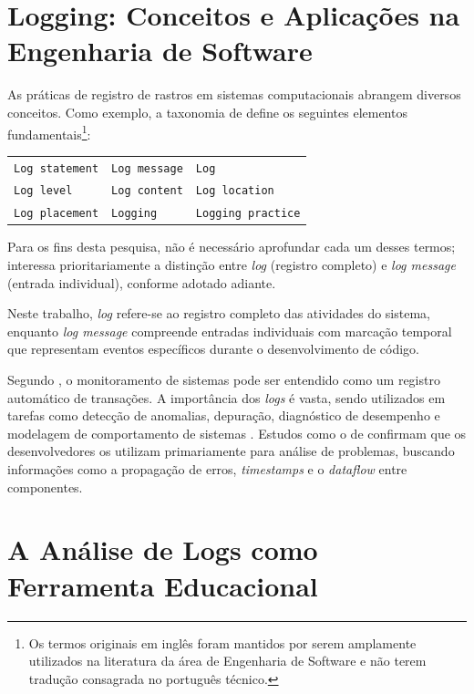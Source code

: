 \section{Logging: Conceitos e Aplicações na Engenharia de Software}
\label{sec:conceitos-logging}

As práticas de registro de rastros em sistemas computacionais abrangem diversos conceitos. Como exemplo, a taxonomia de \cite{gu2022logging} define os seguintes elementos fundamentais\footnote{Os termos originais em inglês foram mantidos por serem amplamente utilizados na literatura da área de Engenharia de Software e não terem tradução consagrada no português técnico.}:

\begingroup
\renewcommand{\arraystretch}{1.2}
\begin{tabular}{p{}p{}p{}}
    \texttt{Log statement} & \texttt{Log message} & \texttt{Log} \\
    \texttt{Log level} & \texttt{Log content} & \texttt{Log location} \\
    \texttt{Log placement} & \texttt{Logging} & \texttt{Logging practice} \\
\end{tabular}
\endgroup
\vspace{2em}

Para os fins desta pesquisa, não é necessário aprofundar cada um desses termos; interessa prioritariamente a distinção entre \textit{log} (registro completo) e \textit{log message} (entrada individual), conforme adotado adiante.

Neste trabalho, \textit{log} refere-se ao registro completo das atividades do sistema, enquanto \textit{log message} compreende entradas individuais com marcação temporal que representam eventos específicos durante o desenvolvimento de código.

Segundo \cite{rice1983use}, o monitoramento de sistemas pode ser entendido como um registro automático de transações. A importância dos \textit{logs} é vasta, sendo utilizados em tarefas como detecção de anomalias, depuração, diagnóstico de desempenho e modelagem de comportamento de sistemas \cite{fu_where_2014}. Estudos como o de \cite{yang2021interview} confirmam que os desenvolvedores os utilizam primariamente para análise de problemas, buscando informações como a propagação de erros, \textit{timestamps} e o \textit{dataflow} entre componentes.

\section{A Análise de Logs como Ferramenta Educacional}
\label{sec:logs-educacionais}


